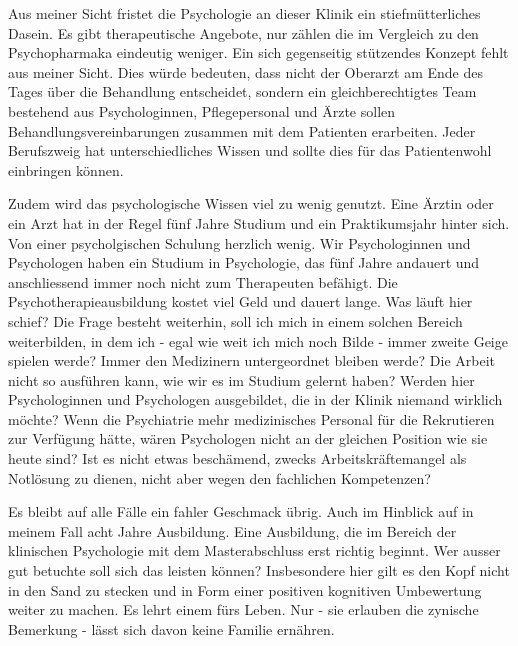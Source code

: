 Aus meiner Sicht fristet die Psychologie an dieser Klinik ein stiefmütterliches Dasein. Es gibt therapeutische Angebote, nur zählen die im Vergleich zu den Psychopharmaka eindeutig weniger. Ein sich gegenseitig stützendes Konzept fehlt aus meiner Sicht. Dies würde bedeuten, dass nicht der Oberarzt am Ende des Tages über die Behandlung entscheidet, sondern ein gleichberechtigtes Team bestehend aus Psychologinnen, Pflegepersonal und Ärzte sollen Behandlungsvereinbarungen zusammen mit dem Patienten erarbeiten. Jeder Berufszweig hat unterschiedliches Wissen und sollte dies für das Patientenwohl einbringen können. 

Zudem wird das psychologische Wissen viel zu wenig genutzt. Eine Ärztin oder ein Arzt hat in der Regel fünf Jahre Studium und ein Praktikumsjahr hinter sich. Von einer psycholgischen Schulung herzlich wenig. Wir Psychologinnen und Psychologen haben ein Studium in Psychologie, das fünf Jahre andauert und anschliessend immer noch nicht zum Therapeuten befähigt. Die Psychotherapieausbildung kostet viel Geld und dauert lange. Was läuft hier schief? Die Frage besteht weiterhin, soll ich mich in einem solchen Bereich weiterbilden, in dem ich - egal wie weit ich mich noch Bilde - immer zweite Geige spielen werde? Immer den Medizinern untergeordnet bleiben werde? Die Arbeit nicht so ausführen kann, wie wir es im Studium gelernt haben? Werden hier Psychologinnen und Psychologen ausgebildet, die in der Klinik niemand wirklich möchte? Wenn die Psychiatrie mehr medizinisches Personal für die Rekrutieren zur Verfügung hätte, wären Psychologen nicht an der gleichen Position wie sie heute sind? Ist es nicht etwas beschämend, zwecks Arbeitskräftemangel als Notlösung zu dienen, nicht aber wegen den fachlichen Kompetenzen? 

Es bleibt auf alle Fälle ein fahler Geschmack übrig. Auch im Hinblick auf in meinem Fall acht Jahre Ausbildung. Eine Ausbildung, die im Bereich der klinischen Psychologie mit dem Masterabschluss erst richtig beginnt. Wer ausser gut betuchte soll sich das leisten können? Insbesondere hier gilt es den Kopf nicht in den Sand zu stecken und in Form einer positiven kognitiven Umbewertung weiter zu machen. Es lehrt einem fürs Leben. Nur - sie erlauben die zynische Bemerkung - lässt sich davon keine Familie ernähren.  

